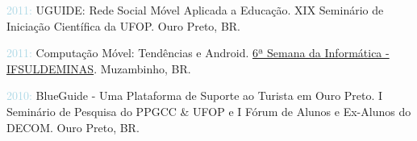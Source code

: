 \begin{innerlist}[-]
    \item \textcolor{lightblue}{2011:} UGUIDE: Rede Social Móvel Aplicada a Educação. XIX Seminário de Iniciação Científica da UFOP. Ouro Preto, BR.
    \item \textcolor{lightblue}{2011:} Computação Móvel: Tendências e Android. \href{https://www2.muz.ifsuldeminas.edu.br/index.php/gerais/1149-semana-da-informatica}{6ª Semana da Informática - IFSULDEMINAS}. Muzambinho, BR.
    \item \textcolor{lightblue}{2010:} BlueGuide - Uma Plataforma de Suporte ao Turista em Ouro Preto. I Seminário de Pesquisa do PPGCC \& UFOP e I Fórum de Alunos e Ex-Alunos do DECOM. Ouro Preto, BR.
    
\end{innerlist}


